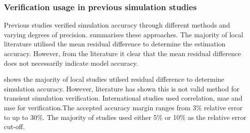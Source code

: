 	\subsubsection{Verification usage in previous simulation studies}
 	Previous studies verified simulation accuracy through different methods and varying degrees of precision.  summarises these approaches. The majority of local literature utilised the mean residual difference to determine the estimation accuracy. However, from the literature it clear that the mean residual difference does not necessarily indicate model accuracy. 
 	\par 
 	  shows the majority of local studies utilsed residual difference to determine simulation accuracy. However, literature has shown this is not valid method for transient simulation verification. International studies used correlation, \gls{mae} and \gls{mse} for verification.The accepted accuracy margin ranges from 3\% relative error to  up to 30\%. The majority of studies used either 5\% or 10\%  as the relative error cut-off.
 	 
